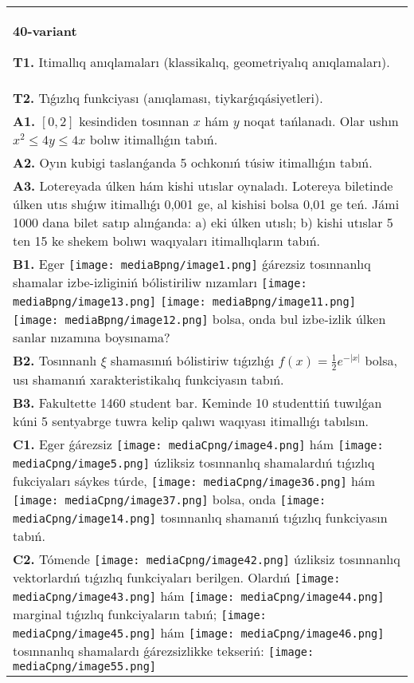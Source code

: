 \documentclass{article}
\begin{document}
\begin{tabular}{m{17cm}}
\textbf{40-variant}
\newline

\textbf{T1.} Itimallıq anıqlamaları (klassikalıq, geometriyalıq anıqlamaları).
 \\
\textbf{T2.} Tıǵızlıq funkciyası (anıqlaması, tiykarǵıqásiyetleri).
 \\
\textbf{A1.} $\left[ 0,2 \right]$ kesindiden tosınnan $x$ hám $y$ noqat tańlanadı. Olar ushın ${{x}^{2}}\le 4y\le 4x$ bolıw itimallıǵın tabıń.
 \\
\textbf{A2.} Oyın kubigi taslanǵanda 5 ochkonıń túsiw itimallıǵın tabıń.
 \\
\textbf{A3.} Lotereyada úlken hám kishi utıslar oynaladı. Lotereya biletinde úlken utıs shıǵıw itimallıǵı 0,001 ge, al kishisi bolsa 0,01 ge teń. Jámi 1000 dana bilet satıp alınǵanda: a) eki úlken utıslı; b) kishi utıslar 5 ten 15 ke shekem bolıwı waqıyaları itimallıqların tabıń.
 \\
\textbf{B1.} Eger \texttt{[image: mediaBpng/image1.png]} ǵárezsiz tosınnanlıq shamalar izbe-izliginiń bólistiriliw nızamları
\texttt{[image: mediaBpng/image13.png]} \texttt{[image: mediaBpng/image11.png]} \texttt{[image: mediaBpng/image12.png]}
bolsa, onda bul izbe-izlik úlken sanlar nızamına boysınama?
 \\
\textbf{B2.} Tosınnanlı \(\xi\) shamasınıń bólistiriw tıǵızlıǵı \(f(x) = \frac{1}{2}e^{- |x|}\) bolsa, usı shamanıń xarakteristikalıq funkciyasın tabıń.
 \\
\textbf{B3.} Fakultette 1460 student bar. Keminde 10 studenttiń tuwılǵan kúni 5 sentyabrge tuwra kelip qalıwı waqıyası itimallıǵı tabılsın.
 \\
\textbf{C1.} Eger ǵárezsiz \texttt{[image: mediaCpng/image4.png]} hám \texttt{[image: mediaCpng/image5.png]} úzliksiz tosınnanlıq shamalardıń tıǵızlıq fukciyaları sáykes túrde,
\texttt{[image: mediaCpng/image36.png]} hám \texttt{[image: mediaCpng/image37.png]}
bolsa, onda \texttt{[image: mediaCpng/image14.png]} tosınnanlıq shamanıń tıǵızlıq funkciyasın tabıń.
 \\
\textbf{C2.} Tómende \texttt{[image: mediaCpng/image42.png]} úzliksiz tosınnanlıq vektorlardıń tıǵızlıq funkciyaları berilgen. Olardıń \texttt{[image: mediaCpng/image43.png]} hám \texttt{[image: mediaCpng/image44.png]} marginal tıǵızlıq funkciyaların tabıń; \texttt{[image: mediaCpng/image45.png]} hám \texttt{[image: mediaCpng/image46.png]} tosınnanlıq shamalardı ǵárezsizlikke tekseriń: \texttt{[image: mediaCpng/image55.png]}

\end{tabular}
\end{document}
